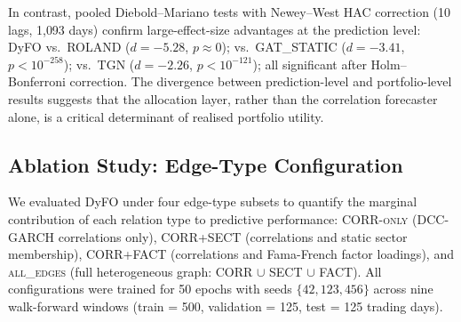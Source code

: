 \documentclass[runningheads]{llncs}
\begin{document}


In contrast, pooled Diebold--Mariano tests with Newey--West HAC correction (10 lags, 1{,}093 days) confirm large-effect-size advantages at the prediction level: DyFO vs.\ ROLAND ($d = -5.28$, $p \approx 0$); vs.\ GAT\_STATIC ($d = -3.41$, $p < 10^{-258}$); vs.\ TGN ($d = -2.26$, $p < 10^{-121}$); all significant after Holm--Bonferroni correction. The divergence between prediction-level and portfolio-level results suggests that the allocation layer, rather than the correlation forecaster alone, is a critical determinant of realised portfolio utility.

\subsection{Ablation Study: Edge-Type Configuration}
\label{sec:ablation}

We evaluated DyFO under four edge-type subsets to quantify the marginal contribution of each relation type to predictive performance:
\textsc{CORR-only} (DCC-GARCH correlations only),
\textsc{CORR+SECT} (correlations and static sector membership),
\textsc{CORR+FACT} (correlations and Fama-French factor loadings), and
\textsc{all\_edges} (full heterogeneous graph: CORR $\cup$ SECT $\cup$ FACT).
All configurations were trained for 50 epochs with seeds $\{42, 123, 456\}$
across nine walk-forward windows (train = 500, validation = 125, test = 125
trading days).
\end{document}
